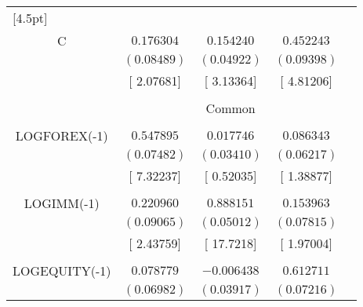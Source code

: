 \begin{tabular}{lrrrr}
[4.5pt] \hline \\ [-4.5pt]
\multicolumn{1}{c}{C}&\multicolumn{1}{c}{$0.176304$}&\multicolumn{1}{c}{$0.154240$}&\multicolumn{1}{c}{$0.452243$}&\multicolumn{1}{c}{}\\
\multicolumn{1}{c}{}&\multicolumn{1}{c}{$(0.08489)$}&\multicolumn{1}{c}{$(0.04922)$}&\multicolumn{1}{c}{$(0.09398)$}&\multicolumn{1}{c}{}\\
\multicolumn{1}{c}{}&\multicolumn{1}{c}{[ 2.07681]}&\multicolumn{1}{c}{[ 3.13364]}&\multicolumn{1}{c}{[ 4.81206]}&\multicolumn{1}{c}{}\\
[4.5pt] \hline \\ [-4.5pt]
\multicolumn{1}{c}{}&\multicolumn{3}{c}{Common}&\multicolumn{1}{c}{}\\
[4.5pt] \hline \\ [-4.5pt]
\multicolumn{1}{c}{LOGFOREX(-1)}&\multicolumn{1}{c}{$0.547895$}&\multicolumn{1}{c}{$0.017746$}&\multicolumn{1}{c}{$0.086343$}&\multicolumn{1}{c}{}\\
\multicolumn{1}{c}{}&\multicolumn{1}{c}{$(0.07482)$}&\multicolumn{1}{c}{$(0.03410)$}&\multicolumn{1}{c}{$(0.06217)$}&\multicolumn{1}{c}{}\\
\multicolumn{1}{c}{}&\multicolumn{1}{c}{[ 7.32237]}&\multicolumn{1}{c}{[ 0.52035]}&\multicolumn{1}{c}{[ 1.38877]}&\multicolumn{1}{c}{}\\
\multicolumn{1}{c}{}&\multicolumn{1}{c}{}&\multicolumn{1}{c}{}&\multicolumn{1}{c}{}&\multicolumn{1}{c}{}\\
\multicolumn{1}{c}{LOGIMM(-1)}&\multicolumn{1}{c}{$0.220960$}&\multicolumn{1}{c}{$0.888151$}&\multicolumn{1}{c}{$0.153963$}&\multicolumn{1}{c}{}\\
\multicolumn{1}{c}{}&\multicolumn{1}{c}{$(0.09065)$}&\multicolumn{1}{c}{$(0.05012)$}&\multicolumn{1}{c}{$(0.07815)$}&\multicolumn{1}{c}{}\\
\multicolumn{1}{c}{}&\multicolumn{1}{c}{[ 2.43759]}&\multicolumn{1}{c}{[ 17.7218]}&\multicolumn{1}{c}{[ 1.97004]}&\multicolumn{1}{c}{}\\
\multicolumn{1}{c}{}&\multicolumn{1}{c}{}&\multicolumn{1}{c}{}&\multicolumn{1}{c}{}&\multicolumn{1}{c}{}\\
\multicolumn{1}{c}{LOGEQUITY(-1)}&\multicolumn{1}{c}{$0.078779$}&\multicolumn{1}{c}{$-0.006438$}&\multicolumn{1}{c}{$0.612711$}&\multicolumn{1}{c}{}\\
\multicolumn{1}{c}{}&\multicolumn{1}{c}{$(0.06982)$}&\multicolumn{1}{c}{$(0.03917)$}&\multicolumn{1}{c}{$(0.07216)$}&\multicolumn{1}{c}{}\\

\end{tabular}
